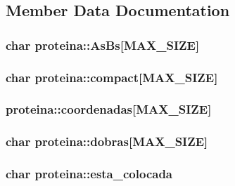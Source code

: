 \subsection{Member Data Documentation}
\hypertarget{structproteina_a9ea7689fbbef51b52b26da34bd2b8ddb}{
\subsubsection[{As\-Bs}]{\setlength{\rightskip}{0pt plus 5cm}char proteina\-::\-As\-Bs\mbox{[}{\bf M\-A\-X\-\_\-\-S\-I\-Z\-E}\mbox{]}}}\label{structproteina_a9ea7689fbbef51b52b26da34bd2b8ddb}
\hypertarget{structproteina_ab229e1b19f1bceafc28f7beafb2e3c83}{
\subsubsection[{compact}]{\setlength{\rightskip}{0pt plus 5cm}char proteina\-::compact\mbox{[}{\bf M\-A\-X\-\_\-\-S\-I\-Z\-E}\mbox{]}}}\label{structproteina_ab229e1b19f1bceafc28f7beafb2e3c83}
\hypertarget{structproteina_a0379de907b6d76a996b59e7200140445}{
\subsubsection[{coordenadas}]{ proteina\-::coordenadas\mbox{[}{\bf M\-A\-X\-\_\-\-S\-I\-Z\-E}\mbox{]}}}\label{structproteina_a0379de907b6d76a996b59e7200140445}
\hypertarget{structproteina_a9f2426a372510367a6e9609c141db95c}{
\subsubsection[{dobras}]{\setlength{\rightskip}{0pt plus 5cm}char proteina\-::dobras\mbox{[}{\bf M\-A\-X\-\_\-\-S\-I\-Z\-E}\mbox{]}}}\label{structproteina_a9f2426a372510367a6e9609c141db95c}
\hypertarget{structproteina_aa798eeae3896b51328073cc34880cdcd}{
\subsubsection[{esta\-\_\-colocada}]{\setlength{\rightskip}{0pt plus 5cm}char proteina\-::esta\-\_\-colocada}}\label{structproteina_aa798eeae3896b51328073cc34880cdcd}
